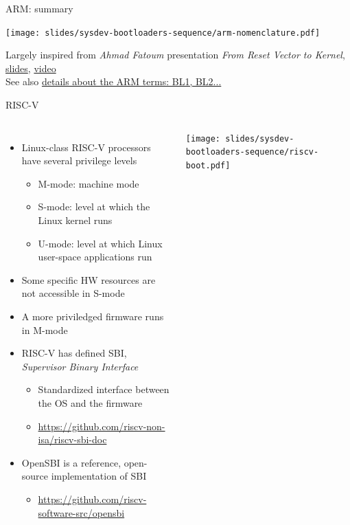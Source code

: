 \begin{frame}{ARM: summary}
  \begin{center}
    \texttt{[image: slides/sysdev-bootloaders-sequence/arm-nomenclature.pdf]}
  \end{center}
  {\small Largely inspired from {\em Ahmad Fatoum} presentation
    {\em From Reset Vector to Kernel},
    \href{https://archive.fosdem.org/2021/schedule/event/from_reset_vector_to_kernel/attachments/slides/4632/export/events/attachments/from_reset_vector_to_kernel/slides/4632/from_reset_vector_to_kernel.pdf}{slides},
    \href{https://www.youtube.com/watch?v=-Ak9MWGxd7M}{video}}\\
    See also
    \href{https://trustedfirmware-a.readthedocs.io/en/latest/design/firmware-design.html}
    {details about the ARM terms: BL1, BL2...}
\end{frame}

\begin{frame}{RISC-V}
  \begin{columns}
    \begin{itemize}
    \item Linux-class RISC-V processors have several privilege levels
      \begin{itemize}
      \item M-mode: machine mode
      \item S-mode: level at which the Linux kernel runs
      \item U-mode: level at which Linux user-space
        applications run
      \end{itemize}
    \item Some specific HW resources are not accessible in S-mode
    \item A more priviledged firmware runs in M-mode
    \item RISC-V has defined SBI, {\em Supervisor Binary Interface}
      \begin{itemize}
      \item Standardized interface between the OS and the firmware
      \item \url{https://github.com/riscv-non-isa/riscv-sbi-doc}
      \end{itemize}
    \item OpenSBI is a reference, open-source implementation of SBI
      \begin{itemize}
      \item \url{https://github.com/riscv-software-src/opensbi}
      \end{itemize}
    \end{itemize}
    \texttt{[image: slides/sysdev-bootloaders-sequence/riscv-boot.pdf]}
  \end{columns}
\end{frame}

